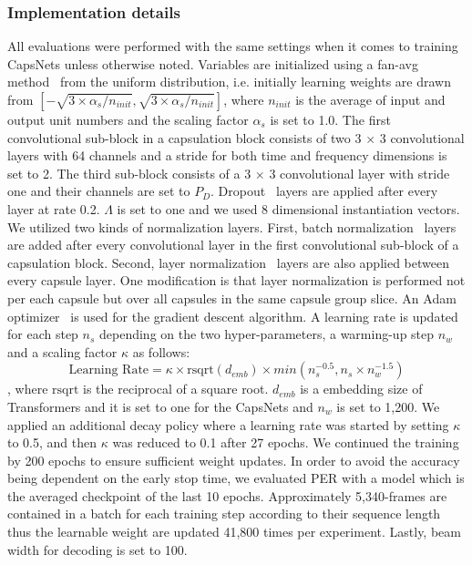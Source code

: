 \documentclass[review]{elsarticle}
\begin{document}
\subsubsection{Implementation details}
All evaluations were performed with the same settings when it comes to training CapsNets unless otherwise noted.
Variables are initialized using a fan-avg method~\citep{DBLP:journals/jmlr/GlorotB10} from the uniform distribution, i.e. initially learning weights are drawn from $[-\sqrt{3 \times \alpha_s / n_{init}}, \sqrt{3 \times \alpha_s / n_{init}}]$, where $n_{init}$ is the average of input and output unit numbers and the scaling factor $\alpha_s$ is set to 1.0.
The first convolutional sub-block in a capsulation block consists of two 3 $\times$ 3 convolutional layers with 64 channels and a stride for both time and frequency dimensions is set to 2.
The third sub-block consists of a 3 $\times$ 3 convolutional layer with stride one and their channels are set to $P_D$.
Dropout~\citep{DBLP:journals/jmlr/SrivastavaHKSS14} layers are applied after every layer at rate 0.2.
$\Lambda$ is set to one and we used 8 dimensional instantiation vectors.
We utilized two kinds of normalization layers.
First, batch normalization~\citep{DBLP:conf/icml/IoffeS15} layers are added after every convolutional layer in the first convolutional sub-block of a capsulation block.
Second, layer normalization~\citep{DBLP:journals/corr/BaKH16} layers are also applied between every capsule layer.
One modification is that layer normalization is performed not per each capsule but over all capsules in the same capsule group slice.
An Adam optimizer~\citep{DBLP:journals/corr/KingmaB14} is used for the gradient descent algorithm.
A learning rate is updated for each step $n_{s}$ depending on the two hyper-parameters, a warming-up step $n_{w}$ and a scaling factor $\kappa$ as follows:
\begin{equation}
\text{Learning Rate} = \kappa \times \text{rsqrt}(d_{emb}) \times min(n_{s}^{-0.5}, n_{s} \times n_{w}^{-1.5})
\label{eq:lr}
\end{equation}
, where $\text{rsqrt}$ is the reciprocal of a square root.
$d_{emb}$ is a embedding size of Transformers and it is set to one for the CapsNets and $n_{w}$ is set to 1,200.
We applied an additional decay policy where a learning rate was started by setting $\kappa$ to 0.5, and then $\kappa$ was reduced to 0.1 after 27 epochs.
We continued the training by 200 epochs to ensure sufficient weight updates.
In order to avoid the accuracy being dependent on the early stop time, we evaluated PER with a model which is the averaged checkpoint of the last 10 epochs.
Approximately 5,340-frames are contained in a batch for each training step according to their sequence length thus the learnable weight are updated 41,800 times per experiment.
Lastly, beam width for decoding is set to 100.
\end{document}
